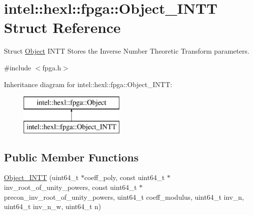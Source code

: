 \hypertarget{structintel_1_1hexl_1_1fpga_1_1Object__INTT}{\section{intel\-:\-:hexl\-:\-:fpga\-:\-:Object\-\_\-\-I\-N\-T\-T Struct Reference}
\label{structintel_1_1hexl_1_1fpga_1_1Object__INTT}
}


Struct \hyperlink{structintel_1_1hexl_1_1fpga_1_1Object}{Object} I\-N\-T\-T Stores the Inverse Number Theoretic Transform parameters.  




{\ttfamily \#include $<$fpga.\-h$>$}

Inheritance diagram for intel\-:\-:hexl\-:\-:fpga\-:\-:Object\-\_\-\-I\-N\-T\-T\-:\begin{figure}[H]
\begin{center}
\leavevmode
\includegraphics[height=2.000000cm]{structintel_1_1hexl_1_1fpga_1_1Object__INTT}
\end{center}
\end{figure}
\subsection*{Public Member Functions}
\begin{DoxyCompactItemize}
\item 
\hyperlink{structintel_1_1hexl_1_1fpga_1_1Object__INTT_a6adb4aade14db1ab41a49f21b7915527}{Object\-\_\-\-I\-N\-T\-T} (uint64\-\_\-t $\ast$coeff\-\_\-poly, const uint64\-\_\-t $\ast$inv\-\_\-root\-\_\-of\-\_\-unity\-\_\-powers, const uint64\-\_\-t $\ast$precon\-\_\-inv\-\_\-root\-\_\-of\-\_\-unity\-\_\-powers, uint64\-\_\-t coeff\-\_\-modulus, uint64\-\_\-t inv\-\_\-n, uint64\-\_\-t inv\-\_\-n\-\_\-w, uint64\-\_\-t n)
\end{DoxyCompactItemize}
